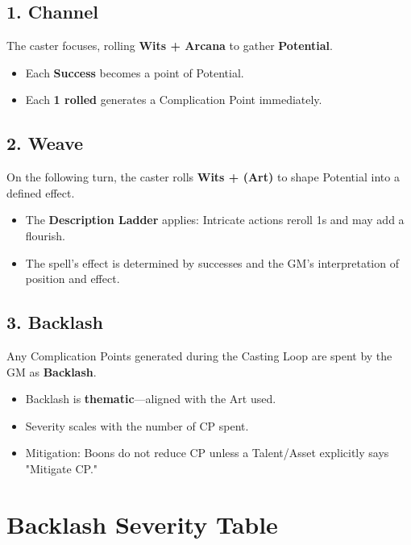 \subsection*{1. Channel}

The caster focuses, rolling \textbf{Wits + Arcana}  to gather \textbf{Potential}.

\begin{itemize}
  \item Each \textbf{Success} becomes a point of Potential.
  \item Each \textbf{1 rolled} generates a Complication Point immediately.
\end{itemize}

\subsection*{2. Weave}

On the following turn, the caster rolls \textbf{Wits + (Art)} to shape Potential into a defined effect.

\begin{itemize}
  \item The \textbf{Description Ladder}  applies: Intricate actions reroll 1s and may add a flourish.
  \item The spell's effect is determined by successes and the GM's interpretation of position and effect.
\end{itemize}

\subsection*{3. Backlash}

Any Complication Points generated during the Casting Loop are spent by the GM as \textbf{Backlash}.

\begin{itemize}
  \item Backlash is \textbf{thematic}—aligned with the Art used.
  \item Severity scales with the number of CP spent.
  \item Mitigation: Boons  do not reduce CP unless a Talent/Asset explicitly says "Mitigate CP."
\end{itemize}

\section{Backlash Severity Table}

